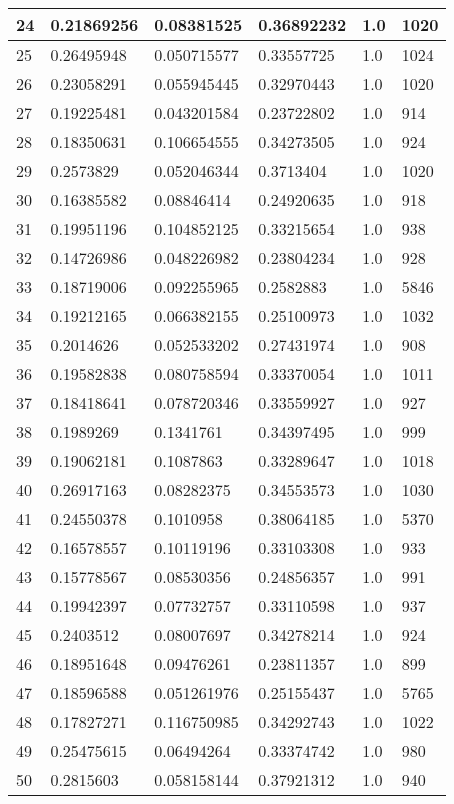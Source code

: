 \begin{longtable}{|l|l|l|l|l|l|}
24 & 0.21869256 & 0.08381525 & 0.36892232 & 1.0 & 1020 \\ \hline 
25 & 0.26495948 & 0.050715577 & 0.33557725 & 1.0 & 1024 \\ \hline 
26 & 0.23058291 & 0.055945445 & 0.32970443 & 1.0 & 1020 \\ \hline 
27 & 0.19225481 & 0.043201584 & 0.23722802 & 1.0 & 914 \\ \hline 
28 & 0.18350631 & 0.106654555 & 0.34273505 & 1.0 & 924 \\ \hline 
29 & 0.2573829 & 0.052046344 & 0.3713404 & 1.0 & 1020 \\ \hline 
30 & 0.16385582 & 0.08846414 & 0.24920635 & 1.0 & 918 \\ \hline 
31 & 0.19951196 & 0.104852125 & 0.33215654 & 1.0 & 938 \\ \hline 
32 & 0.14726986 & 0.048226982 & 0.23804234 & 1.0 & 928 \\ \hline 
33 & 0.18719006 & 0.092255965 & 0.2582883 & 1.0 & 5846 \\ \hline 
34 & 0.19212165 & 0.066382155 & 0.25100973 & 1.0 & 1032 \\ \hline 
35 & 0.2014626 & 0.052533202 & 0.27431974 & 1.0 & 908 \\ \hline 
36 & 0.19582838 & 0.080758594 & 0.33370054 & 1.0 & 1011 \\ \hline 
37 & 0.18418641 & 0.078720346 & 0.33559927 & 1.0 & 927 \\ \hline 
38 & 0.1989269 & 0.1341761 & 0.34397495 & 1.0 & 999 \\ \hline 
39 & 0.19062181 & 0.1087863 & 0.33289647 & 1.0 & 1018 \\ \hline 
40 & 0.26917163 & 0.08282375 & 0.34553573 & 1.0 & 1030 \\ \hline 
41 & 0.24550378 & 0.1010958 & 0.38064185 & 1.0 & 5370 \\ \hline 
42 & 0.16578557 & 0.10119196 & 0.33103308 & 1.0 & 933 \\ \hline 
43 & 0.15778567 & 0.08530356 & 0.24856357 & 1.0 & 991 \\ \hline 
44 & 0.19942397 & 0.07732757 & 0.33110598 & 1.0 & 937 \\ \hline 
45 & 0.2403512 & 0.08007697 & 0.34278214 & 1.0 & 924 \\ \hline 
46 & 0.18951648 & 0.09476261 & 0.23811357 & 1.0 & 899 \\ \hline 
47 & 0.18596588 & 0.051261976 & 0.25155437 & 1.0 & 5765 \\ \hline 
48 & 0.17827271 & 0.116750985 & 0.34292743 & 1.0 & 1022 \\ \hline 
49 & 0.25475615 & 0.06494264 & 0.33374742 & 1.0 & 980 \\ \hline 
50 & 0.2815603 & 0.058158144 & 0.37921312 & 1.0 & 940 \\ \hline 
\end{longtable}